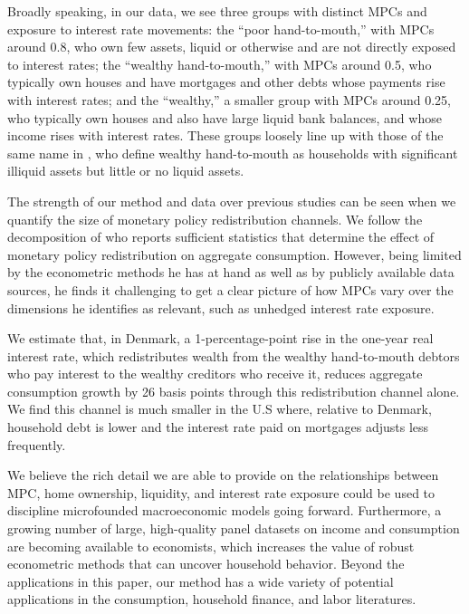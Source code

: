 \documentclass[titlepage]{\econtex}\newcommand{\texname}{ConsumptionHeterogeneity}
\begin{document}
	Broadly speaking, in our data, we see three groups with distinct MPCs and exposure to interest rate movements: the ``poor hand-to-mouth,'' with MPCs around 0.8, who own few assets, liquid or otherwise and are not directly exposed to interest rates; the ``wealthy hand-to-mouth,'' with MPCs around 0.5, who typically own houses and have mortgages and other debts whose payments rise with interest rates; and the ``wealthy,'' a smaller group with MPCs around 0.25, who typically own houses and also have large liquid bank balances, and whose income rises with interest rates. These groups loosely line up with those of the same name in \cite{violante_wealthy_2014}, who define wealthy hand-to-mouth as households with significant illiquid assets but little or no liquid assets.
	
	The strength of our method and data over previous studies can be seen when we quantify the size of monetary policy redistribution channels. We follow the decomposition of \cite{auclert_monetary_2017} who reports sufficient statistics that determine the effect of monetary policy redistribution on aggregate consumption. However, being limited by the econometric methods he has at hand as well as by publicly available data sources, he finds it challenging to get a clear picture of how MPCs vary over the dimensions he identifies as relevant, such as unhedged interest rate exposure.
	
	We estimate that, in Denmark, a 1-percentage-point rise in the one-year real interest rate, which redistributes wealth from the wealthy hand-to-mouth debtors who pay interest to the wealthy creditors who receive it, reduces aggregate consumption growth by 26 basis points through this redistribution channel alone. We find this channel is much smaller in the U.S where, relative to Denmark, household debt is lower and the interest rate paid on mortgages adjusts less frequently.
	
	We believe the rich detail we are able to provide on the relationships between MPC, home ownership, liquidity, and interest rate exposure could be used to discipline microfounded macroeconomic models going forward. Furthermore, a growing number of large, high-quality panel datasets on income and consumption are becoming available to economists, which increases the value of robust econometric methods that can uncover household behavior. Beyond the applications in this paper, our method has a wide variety of potential applications in the consumption, household finance, and labor literatures.
	
\end{document}
